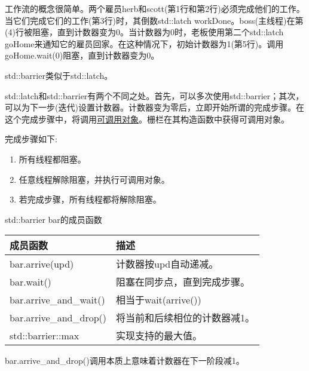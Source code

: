 工作流的概念很简单。两个雇员herb和scott(第1行和第2行)必须完成他们的工作。当它们完成它们的工作(第3行)时，其倒数std::latch workDone。boss(主线程)在第(4)行被阻塞，直到计数器变为0。当计数器为0时，老板使用第二个std::latch goHome来通知它的雇员回家。在这种情况下，初始计数器为1(第5行)。调用goHome.wait(0)阻塞，直到计数器变为0。


std::barrier类似于std::latch。


std::latch和std::barrier有两个不同之处。首先，可以多次使用std::barrier；其次，可以为下一步(迭代)设置计数器。计数器变为零后，立即开始所谓的完成步骤。在这个完成步骤中，将调用\href{https://en.cppreference.com/w/cpp/named_req/Callable}{可调用对象}。栅栏在其构造函数中获得可调用对象。

完成步骤如下:

\begin{enumerate}
\item 
所有线程都阻塞。

\item 
任意线程解除阻塞，并执行可调用对象。

\item 
若完成步骤，所有线程都将解除阻塞。
\end{enumerate}

\begin{center}
std::barrier bar的成员函数
\end{center}

\begin{longtable}[c]{|l|l|}
\hline
\textbf{成员函数} & \textbf{描述}                           \\ \hline
\endfirsthead
%
\endhead
%
bar.arrive(upd)          & 计数器按upd自动递减。          \\ \hline
bar.wait()              & 阻塞在同步点，直到完成步骤。  \\ \hline
bar.arrive\_and\_wait()  & 相当于wait(arrive())                  \\ \hline
bar.arrive\_and\_drop() & 将当前和后续相位的计数器减1。\\ \hline
std::barrier::max        & 实现支持的最大值。 \\ \hline
\end{longtable}

bar.arrive\_and\_drop()调用本质上意味着计数器在下一阶段减1。


















